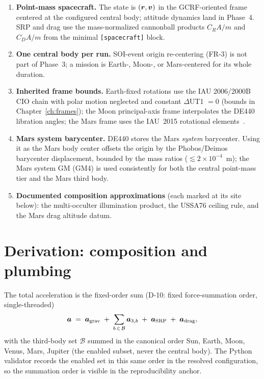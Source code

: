 \begin{enumerate}
  \item \textbf{Point-mass spacecraft.} The state is $(\bm{r}, \bm{v})$
    in the GCRF-oriented frame centered at the configured central body;
    attitude dynamics land in Phase~4. SRP and drag use the mass-normalized
    cannonball products $C_R A / m$ and $C_D A / m$ from the minimal
    \texttt{[spacecraft]} block.
  \item \textbf{One central body per run.} SOI-event origin re-centering
    (FR-3) is not part of Phase~3; a mission is Earth-, Moon-, or
    Mars-centered for its whole duration.
  \item \textbf{Inherited frame bounds.} Earth-fixed rotations use the
    IAU 2006/2000B CIO chain with polar motion neglected and constant
    $\Delta$UT1 $= 0$ (bounds in Chapter~\ref{ch:frames}); the Moon
    principal-axis frame interpolates the DE440 libration angles; the
    Mars frame uses the IAU~2015 rotational
    elements~\cite{archinal2018}.
  \item \textbf{Mars system barycenter.} DE440 stores the Mars
    \emph{system} barycenter. Using it as the Mars body center offsets
    the origin by the Phobos/Deimos barycenter displacement, bounded by
    the mass ratios ($\lesssim 2\times10^{-4}$~\unit{\metre}); the Mars
    system GM (GM4) is used consistently for both the central point-mass
    tier and the Mars third body.
  \item \textbf{Documented composition approximations} (each marked at
    its site below): the multi-occulter illumination product, the USSA76
    ceiling rule, and the Mars drag altitude datum.
\end{enumerate}

\section{Derivation: composition and plumbing}
\label{sec:env:composition}

The total acceleration is the fixed-order sum (D-10: fixed
force-summation order, single-threaded)
\begin{equation}
  \label{eq:env:sum}
  \bm{a} \;=\; \bm{a}_{\mathrm{grav}}
  \;+\; \sum_{b\,\in\,\mathcal{B}} \bm{a}_{3,b}
  \;+\; \bm{a}_{\mathrm{SRP}}
  \;+\; \bm{a}_{\mathrm{drag}},
\end{equation}
with the third-body set $\mathcal{B}$ summed in the canonical order Sun,
Earth, Moon, Venus, Mars, Jupiter (the enabled subset, never the central
body). The Python validator records the enabled set in this same order in
the resolved configuration, so the summation order is visible in the
reproducibility anchor.

